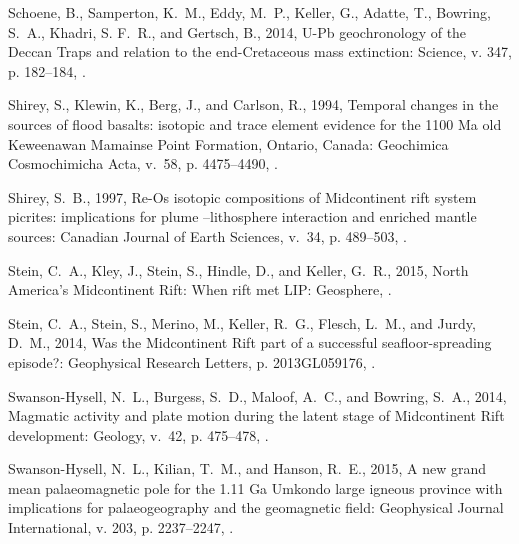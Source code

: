 \documentclass[11pt,letterpaper]{article}
\begin{document}
\begin{thebibliography}{153}
Schoene, B., Samperton, K.~M., Eddy, M.~P., Keller, G., Adatte, T., Bowring,
  S.~A., Khadri, S. F.~R., and Gertsch, B., 2014, {U-Pb geochronology of the
  Deccan Traps and relation to the end-Cretaceous mass extinction}: Science, v.
  347, p. 182--184, .

Shirey, S., Klewin, K., Berg, J., and Carlson, R., 1994, Temporal changes in
  the sources of flood basalts: isotopic and trace element evidence for the
  1100 {M}a old {K}eweenawan {M}amainse {P}oint {F}ormation, {O}ntario,
  {C}anada: Geochimica Cosmochimicha Acta, v.~58, p. 4475--4490,
  .

Shirey, S.~B., 1997, {Re-Os isotopic compositions of Midcontinent rift system
  picrites: implications for plume --lithosphere interaction and enriched
  mantle sources}: Canadian Journal of Earth Sciences, v.~34, p. 489--503,
  .

Stein, C.~A., Kley, J., Stein, S., Hindle, D., and Keller, G.~R., 2015, {North
  America's Midcontinent Rift: When rift met LIP}: Geosphere,
  .

Stein, C.~A., Stein, S., Merino, M., Keller, R.~G., Flesch, L.~M., and Jurdy,
  D.~M., 2014, {Was the Midcontinent Rift part of a successful
  seafloor-spreading episode?}: Geophysical Research Letters, p. 2013GL059176,
  .

Swanson-Hysell, N.~L., Burgess, S.~D., Maloof, A.~C., and Bowring, S.~A.,
  2014{}, Magmatic activity and plate motion during the latent
  stage of {M}idcontinent {R}ift development: Geology, v.~42, p. 475--478,
  .

Swanson-Hysell, N.~L., Kilian, T.~M., and Hanson, R.~E., 2015, {A new grand
  mean palaeomagnetic pole for the 1.11 Ga Umkondo large igneous province with
  implications for palaeogeography and the geomagnetic field}: Geophysical
  Journal International, v. 203, p. 2237--2247, .


\end{thebibliography}
\end{document}
